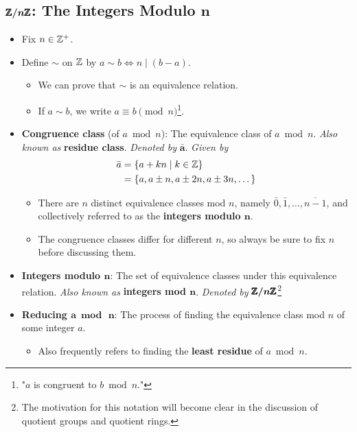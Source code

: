 \documentclass[../notes.tex]{subfiles}
\begin{document}
\subsection*{\texorpdfstring{$\bm{\pmb{\mathbb{Z}}/n\pmb{\mathbb{Z}}}$}{TEXT}: The Integers Modulo \texorpdfstring{$\bm{n}$}{TEXT}}
\begin{itemize}
    \item Fix $n\in\mathbb{Z}^+$.
    \item Define $\sim$ on $\mathbb{Z}$ by $a\sim b\Longleftrightarrow n\mid(b-a)$.
    \begin{itemize}
        \item We can prove that $\sim$ is an equivalence relation.
        \item If $a\sim b$, we write $a\equiv b\pmod n$\footnote{"$a$ is congruent to $b\bmod n$."}.
    \end{itemize}
    \item \textbf{Congruence class} (of $a\bmod n$): The equivalence class of $a\bmod n$. \emph{Also known as} \textbf{residue class}. \emph{Denoted by} $\bm{\bar{a}}$. \emph{Given by}
    \begin{align*}
        \bar{a} &= \{a+kn\mid k\in\mathbb{Z}\}\\
        &= \{a,a\pm n,a\pm 2n,a\pm 3n,\dots\}
    \end{align*}
    \begin{itemize}
        \item There are $n$ distinct equivalence classes mod $n$, namely $\bar{0},\bar{1},\dots,\overline{n-1}$, and collectively referred to as the \textbf{integers modulo $\bm{n}$}.
        \item The congruence classes differ for different $n$, so always be sure to fix $n$ before discussing them.
    \end{itemize}
    \item \textbf{Integers modulo $\bm{n}$}: The set of equivalence classes under this equivalence relation. \emph{Also known as} \textbf{integers mod $\bm{n}$}. \emph{Denoted by} $\bm{\pmb{\mathbb{Z}}/n\pmb{\mathbb{Z}}}$\footnote{The motivation for this notation will become clear in the discussion of quotient groups and quotient rings.}
    \item \textbf{Reducing $\bm{a\bmod\, n}$}: The process of finding the equivalence class mod $n$ of some integer $a$.
    \begin{itemize}
        \item Also frequently refers to finding the \textbf{least residue} of $a\bmod n$.
    \end{itemize}

\end{itemize}
\end{document}
